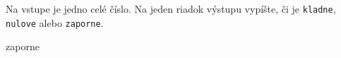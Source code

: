 




Na vstupe je jedno celé číslo. Na jeden riadok výstupu vypíšte, či je \texttt{kladne},
\texttt{nulove} alebo \texttt{zaporne}.

\vystup
zaporne
\koniec


